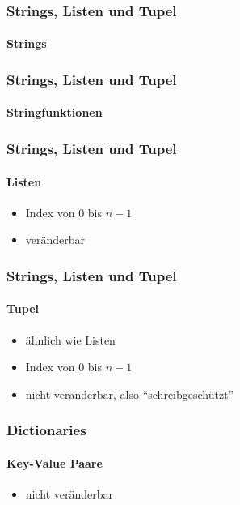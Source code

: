 \documentclass[12pt,ngerman]{beamer}
\begin{document}
\begin{frame}[fragile]
\frametitle{Strings, Listen und Tupel}
\framesubtitle{Strings}



\end{frame}

\begin{frame}[fragile]
\frametitle{Strings, Listen und Tupel}
\framesubtitle{Stringfunktionen}


\end{frame}


\begin{frame}[fragile]
\frametitle{Strings, Listen und Tupel}
\framesubtitle{Listen}

\begin{itemize}
	\item Index von $0$ bis $n-1$
	\item veränderbar
\end{itemize}



\end{frame}


\begin{frame}[fragile]
\frametitle{Strings, Listen und Tupel}
\framesubtitle{Tupel}

\begin{itemize}
	\item ähnlich wie Listen
	\item Index von $0$ bis $n-1$
	\item nicht veränderbar, also \enquote{schreibgeschützt}
\end{itemize}



\end{frame}

\begin{frame}[fragile]
\frametitle{Dictionaries}
\framesubtitle{Key-Value Paare}

\begin{itemize}
	\item nicht veränderbar
\end{itemize}


\end{frame}
\end{document}
